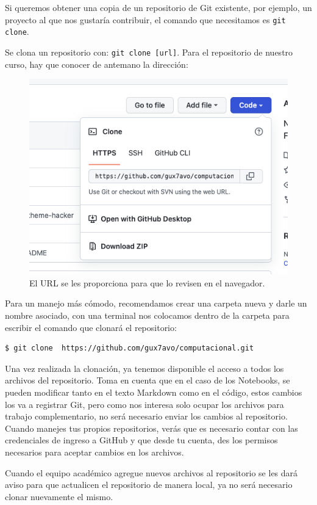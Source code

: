 Si queremos obtener una copia de un repositorio de Git existente, por ejemplo, un proyecto al que nos gustaría contribuir, el comando que necesitamos es \texttt{git clone}.
\par
Se clona un repositorio con: \texttt{git clone [url]}. Para el repositorio de nuestro curso, hay que conocer de antemano la dirección:
\begin{figure}[H]
    \centering
    \includegraphics[scale=0.6]{Imagenes/git_05.png}
    \caption{El URL se les proporciona para que lo revisen en el navegador.}
\end{figure}

Para un manejo más cómodo, recomendamos crear una carpeta nueva y darle un nombre asociado, con una terminal nos colocamos dentro de la carpeta para escribir el comando que clonará el repositorio:
\begin{verbatim}
$ git clone  https://github.com/gux7avo/computacional.git
\end{verbatim}

Una vez realizada la clonación, ya tenemos disponible el acceso a todos los archivos del repositorio. Toma en cuenta que en el caso de los Notebooks, se pueden modificar tanto en el texto Markdown como en el código, estos cambios los va a registrar Git, pero como nos interesa solo ocupar los archivos para trabajo complementario, no será necesario enviar los cambios al repositorio. Cuando manejes tus propios repositorios, verás que es necesario contar con las credenciales de ingreso a GitHub y que desde tu cuenta, des los permisos necesarios para aceptar cambios en los archivos.
\par
Cuando el equipo académico agregue nuevos archivos al repositorio se les dará aviso para que actualicen el repositorio de manera local, ya no será necesario clonar nuevamente el mismo.


